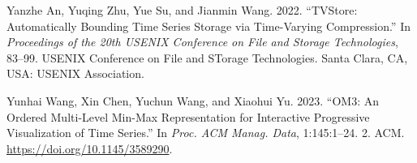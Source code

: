 \documentclass[
]{article}
\newlength{\cslhangindent}
\newlength{\cslentryspacingunit} %
\newenvironment{CSLReferences}[2] %
 {%
  \setlength{\parindent}{0pt}
  \ifodd #1
  \let\oldpar\par
  \def\par{\hangindent=\cslhangindent\oldpar}
  \fi
  \setlength{\parskip}{#2\cslentryspacingunit}
 }%
 {}
\begin{document}
\begin{CSLReferences}{1}{0}
\leavevmode{}%
Yanzhe An, Yuqing Zhu, Yue Su, and Jianmin Wang. 2022. {``TVStore:
Automatically Bounding Time Series Storage via Time-Varying
Compression.''} In \emph{Proceedings of the 20th USENIX Conference on
File and Storage Technologies}, 83--99. USENIX Conference on File and
STorage Technologies. Santa Clara, CA, USA: USENIX Association.

\leavevmode{}%
Yunhai Wang, Xin Chen, Yuchun Wang, and Xiaohui Yu. 2023. {``OM3: An
Ordered Multi-Level Min-Max Representation for Interactive Progressive
Visualization of Time Series.''} In \emph{Proc. ACM Manag. Data},
1:145:1--24. 2. ACM. \url{https://doi.org/10.1145/3589290}.

\end{CSLReferences}
\end{document}
